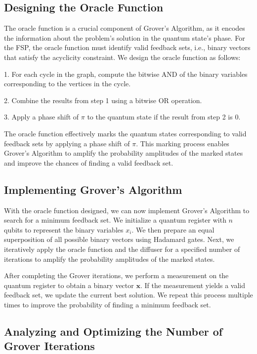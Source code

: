 \subsection{Designing the Oracle Function}
\label{subsec:oracle}

The oracle function is a crucial component of Grover's Algorithm, as it encodes the information about the problem's solution in the quantum state's phase. For the FSP, the oracle function must identify valid feedback sets, i.e., binary vectors that satisfy the acyclicity constraint. We design the oracle function as follows:

1. For each cycle in the graph, compute the bitwise AND of the binary variables corresponding to the vertices in the cycle.

2. Combine the results from step 1 using a bitwise OR operation.

3. Apply a phase shift of $\pi$ to the quantum state if the result from step 2 is $0$.

The oracle function effectively marks the quantum states corresponding to valid feedback sets by applying a phase shift of $\pi$. This marking process enables Grover's Algorithm to amplify the probability amplitudes of the marked states and improve the chances of finding a valid feedback set.

\subsection{Implementing Grover's Algorithm}
\label{subsec:grover_implementation}

With the oracle function designed, we can now implement Grover's Algorithm to search for a minimum feedback set. We initialize a quantum register with $n$ qubits to represent the binary variables $x_i$. We then prepare an equal superposition of all possible binary vectors using Hadamard gates. Next, we iteratively apply the oracle function and the diffuser for a specified number of iterations to amplify the probability amplitudes of the marked states.

After completing the Grover iterations, we perform a measurement on the quantum register to obtain a binary vector $\mathbf{x}$. If the measurement yields a valid feedback set, we update the current best solution. We repeat this process multiple times to improve the probability of finding a minimum feedback set.

\subsection{Analyzing and Optimizing the Number of Grover Iterations}
\label{subsec:grover_iterations}

